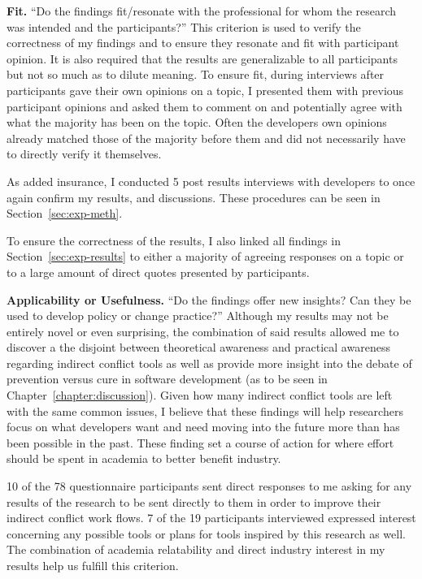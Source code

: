 {\bfseries Fit.} ``Do the findings fit/resonate with the professional for whom the research was intended and the participants?'' This
criterion is used to verify the correctness of my findings and to ensure they resonate and fit with participant opinion. It is also
required that the results are generalizable to all participants but not so much as to dilute meaning. To ensure fit, during interviews
after participants gave their own opinions on a topic, I presented them with previous participant opinions and asked them to comment
on and potentially agree with what the majority has been on the topic. Often the developers own opinions already matched those of
the majority before them and did not necessarily have to directly verify it themselves.

As added insurance, I conducted 5 post results interviews with developers to once again confirm my results, and discussions. These
procedures can be seen in Section~\ref{sec:exp-meth}.

To ensure the correctness of the results, I also linked all findings in Section~\ref{sec:exp-results} to either a majority of agreeing
responses on a topic or to a large amount of direct quotes presented by participants.

{\bfseries Applicability or Usefulness.} ``Do the findings offer new insights? Can they be used to develop policy or change practice?''
Although my results may not be entirely novel or even surprising, the combination of said results allowed me to discover a
the disjoint between theoretical awareness and practical awareness regarding indirect conflict tools as well as provide more
insight into the debate of prevention versus cure in software development (as to be seen in Chapter~\ref{chapter:discussion}). 
Given how many indirect conflict tools are left with the same common
issues, I believe that these findings will help researchers focus on what developers want and need moving into the future more than has
been possible in the past. These finding set a course of action for where effort should be spent in academia to better benefit industry.

10 of the 78 questionnaire participants sent direct responses to me asking for any results of the research to be sent directly to
them in order to improve their indirect conflict work flows. 7 of the 19 participants interviewed expressed interest concerning any possible
tools or plans for tools inspired by this research as well. The combination of academia relatability and direct industry interest 
in my results help us fulfill this criterion.

